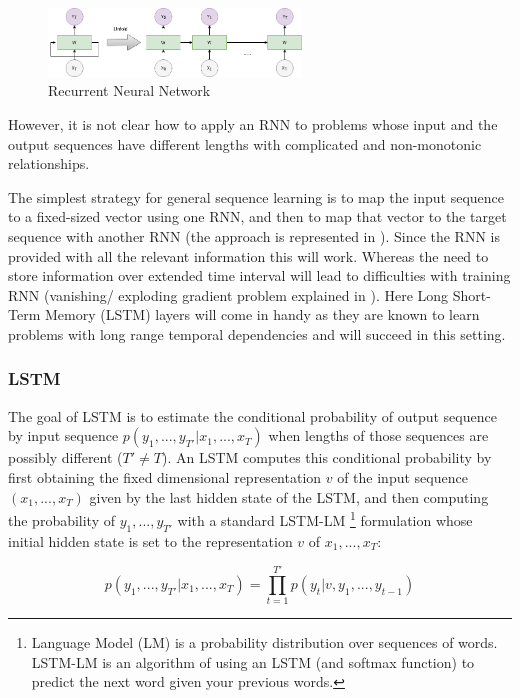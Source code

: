 \begin{figure}[ht]
	\centering
	\includegraphics[width=0.6\textwidth]{img/RNN.png}
	\caption{\label{fig:RNN}Recurrent Neural Network}
\end{figure}
 
However, it is not clear how to apply an RNN to problems whose input and the output sequences have different lengths with complicated and non-monotonic relationships.

The simplest strategy for general sequence learning is to map the input sequence to a fixed-sized
vector using one RNN, and then to map that vector to the target sequence with another RNN (the
approach is represented in \cite{baseline_NMT}). Since the RNN is provided with all the relevant information this will work. Whereas the need to store information over extended time interval will lead to difficulties with training RNN (vanishing/ exploding gradient problem explained in \cite{LSTM_baseline}).
Here Long Short-Term Memory (LSTM) layers will come in handy as they are known to learn problems with long range temporal dependencies and will succeed in this setting.

\subsubsection{LSTM}

The goal of LSTM is to estimate the conditional probability of output sequence by input sequence $p(y_1, ..., y_{T′}|x_1, ..., x_T )$ when lengths of those sequences are possibly different ($T' \neq T$). 
An LSTM computes this conditional probability by first obtaining the fixed dimensional
representation $v$ of the input sequence $(x_1, ..., x_T)$ given by the last hidden state of the LSTM, and then computing the probability of $y_1, ..., y_{T′}$ with a standard LSTM-LM
\footnote{Language Model (LM) is a probability distribution over sequences of words. LSTM-LM is an algorithm of using an LSTM (and softmax function) to predict the next word given your previous words.} 
formulation whose initial hidden state is set to the representation $v$ of  $x_1, ..., x_T$:

$$p(y_1, ..., y_{T′}|x_1, ..., x_T ) = \prod_{t=1}^{T'} p(y_t|v, y_1, ..., y_{t-1}) $$


